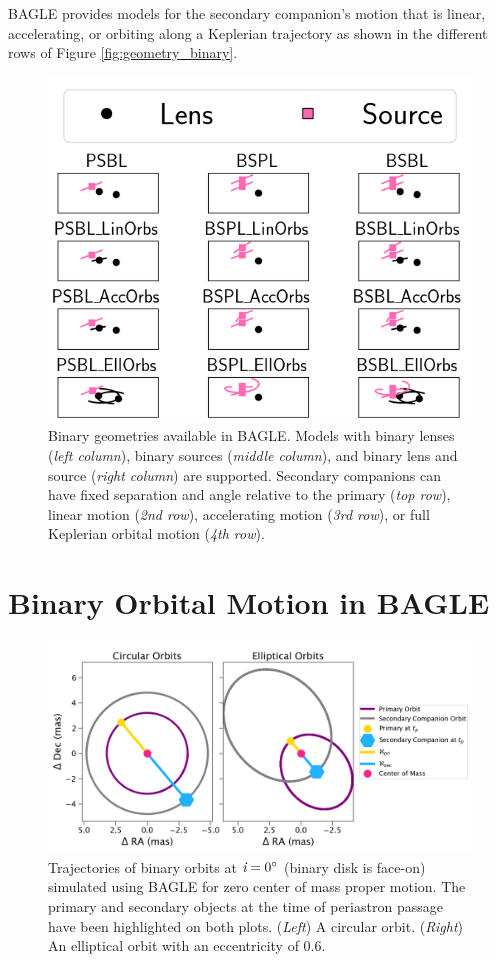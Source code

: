 \documentclass[twocolumn]{aastex701}
\newcommand{\inclination}{\textit{i}}
\begin{document}
BAGLE provides models for the secondary companion's motion that is linear, accelerating, or orbiting along a Keplerian trajectory as shown in the different rows of Figure \ref{fig:geometry_binary}. 

\begin{figure}
    \centering
    \includegraphics[width= .5 \textwidth]{figures/geometry_schematic_binary_familes.png}
    \caption{Binary geometries available in BAGLE. Models with binary lenses ({\em left column}), binary sources ({\em middle column}), and binary lens and source ({\em right column}) are supported. Secondary companions can have fixed separation and angle relative to the primary ({\em top row}), linear motion ({\em 2nd row}), accelerating motion ({\em 3rd row}), or full Keplerian orbital motion ({\em 4th row}).}
    \label{fig:lens_source_models}
\end{figure}



\section{Binary Orbital Motion in BAGLE \label{sec:binary_solutions}}


\begin{figure}
    \centering
    \includegraphics[width=\textwidth]{figures/com_motion.png}
    \caption{Trajectories of binary orbits at $\inclination = 0 \degree$ (binary disk is face-on) simulated using BAGLE for zero center of mass proper motion. The primary and secondary objects at the time of periastron passage have been highlighted on both plots. (\emph{Left}) A circular orbit. (\emph{Right}) An elliptical orbit with an eccentricity of $0.6$. }
    \label{fig:com_geometry}
\end{figure}
\end{document}

